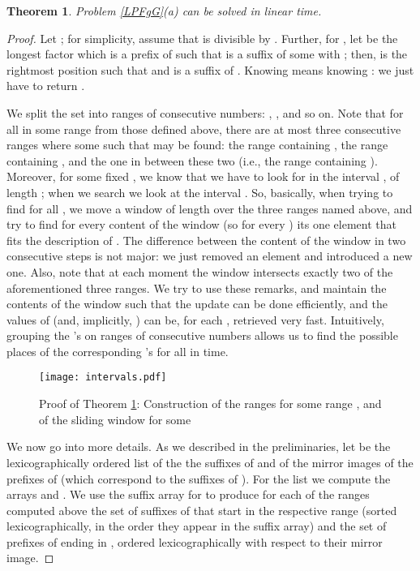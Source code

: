 \documentclass[final]{dmtcs-episciences}
\newtheorem{theorem}{Theorem}
\begin{document}
\begin{theorem}\label{thLPrFgG}
Problem \ref{LPFgG}(a) can be solved in linear time.
\end{theorem}
\begin{proof}
Let ; for simplicity, assume that  is divisible by . Further, for , 
let  be the longest factor which is a prefix of  such that  is a suffix of some  with ; then,  is the rightmost position  such that  and  is a suffix of . Knowing  means knowing : we just have to return . 

We split the set  into  ranges of consecutive numbers: , , and so on. Note that for all  in some range  from those defined above, there are at most three consecutive ranges where some  such that  may be found: the range containing , the range containing , and the one in between these two (i.e., the range containing ). Moreover, for some fixed , we know that we have to look for  in the interval , of length ; when we search  we look at the interval . So, basically, when trying to find  for all , we move a window of length  over the three ranges named above, and try to find for every content of the window (so for every ) its one element that fits the description of . The difference between the content of the window in two consecutive steps is not major: we just removed an element and introduced a new one. Also, note that at each moment the window intersects exactly two of the aforementioned three ranges. We try to use these remarks, and maintain the contents of the window such that the update can be done efficiently, and the values of  (and, implicitly, ) can be, for each , retrieved very fast. Intuitively, grouping the 's on ranges of consecutive numbers allows us to find the possible places of the corresponding 's for all  in  time.

\begin{figure}[H]
\begin{center}
\texttt{[image: intervals.pdf]}
\end{center}
\vspace{-1cm}
\caption{Proof of Theorem \ref{thLPrFgG}: Construction of the ranges  for some range , and of the sliding window  for some }
\end{figure}

We now go into more details. As we described in the preliminaries, let  be the lexicographically ordered list of the the suffixes  of  and of the mirror images  of the prefixes of  (which correspond to the suffixes of ). For the list  we compute the arrays  and . 
We use the suffix array for  to produce for each of the ranges  computed above the set of suffixes of  that start in the respective range (sorted lexicographically, in the order they appear in the suffix array) and the set of prefixes of  ending in , ordered lexicographically with respect to their mirror image. 


\end{proof}
\end{document}

